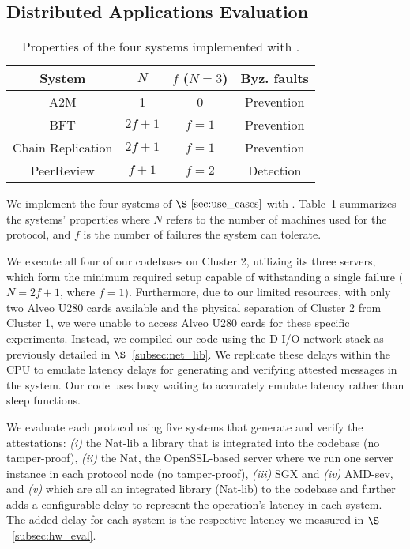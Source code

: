 \subsection{Distributed Applications Evaluation}
\label{subsec:use_cases_eval}

\begin{table}
\begin{center}
\begin{tabular}{ |c|c|c|c| } 
 \hline
 System & $N$ & $f$ ($N=3$) & Byz. faults \\ [0.5ex] \hline \hline
 A2M    & 1 & 0 & Prevention\\
 BFT &  $2f+1$ & $f=1$ & Prevention\\
 Chain Replication &  $2f+1$ & $f=1$ & Prevention\\
 PeerReview & $f+1$ & $f=2$ & Detection\\
 \hline
\end{tabular}
\end{center}
\caption{Properties of the four systems implemented with \projecttitle{}.}
\label{tab:use_cases_options}
\end{table}
We implement the four systems of $\S~\ref{sec:use_cases}$ with \projecttitle{}. Table~\ref{tab:use_cases_options} summarizes the systems' properties where $N$ refers to the number of machines used for the protocol, and $f$ is the number of failures the system can tolerate.

 We execute all four of our codebases on Cluster 2, utilizing its three servers, which form the minimum required setup capable of withstanding a single failure ($N=2f+1$, where $f=1$). Furthermore, due to our limited resources, with only two Alveo U280 cards available and the physical separation of Cluster 2 from Cluster 1, we were unable to access Alveo U280 cards for these specific experiments. Instead, we compiled our code using the D-I/O network stack as previously detailed in $\S$~\ref{subsec:net_lib}. We replicate these delays within the CPU to emulate latency delays for generating and verifying attested messages in the \projecttitle{} system. Our code uses busy waiting to accurately emulate latency rather than sleep functions. 

We evaluate each protocol using five systems that generate and verify the attestations: {\em (i)} the Nat-lib a library that is integrated into the codebase (no tamper-proof), {\em (ii)} the Nat, the OpenSSL-based server where we run one server instance in each protocol node (no tamper-proof), {\em (iii)} SGX and {\em (iv)} AMD-sev, and {\em (v)} \projecttitle{} which are all an integrated library (Nat-lib) to the codebase and further adds a configurable delay to represent the operation's latency in each system. The added delay for each system is the respective latency we measured in $\S$~\ref{subsec:hw_eval}.

